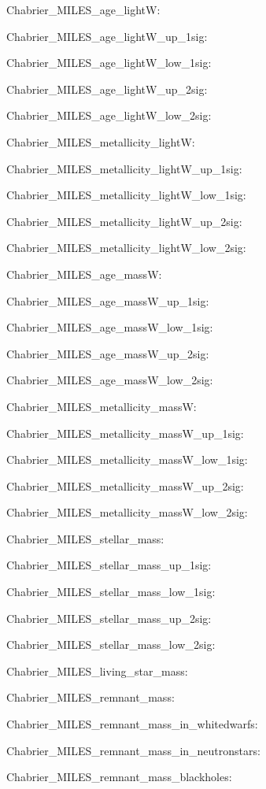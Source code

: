\item Chabrier\_MILES\_age\_lightW: 
\item Chabrier\_MILES\_age\_lightW\_up\_1sig: 
\item Chabrier\_MILES\_age\_lightW\_low\_1sig: 
\item Chabrier\_MILES\_age\_lightW\_up\_2sig: 
\item Chabrier\_MILES\_age\_lightW\_low\_2sig: 
\item Chabrier\_MILES\_metallicity\_lightW: 
\item Chabrier\_MILES\_metallicity\_lightW\_up\_1sig: 
\item Chabrier\_MILES\_metallicity\_lightW\_low\_1sig: 
\item Chabrier\_MILES\_metallicity\_lightW\_up\_2sig: 
\item Chabrier\_MILES\_metallicity\_lightW\_low\_2sig: 
\item Chabrier\_MILES\_age\_massW: 
\item Chabrier\_MILES\_age\_massW\_up\_1sig: 
\item Chabrier\_MILES\_age\_massW\_low\_1sig: 
\item Chabrier\_MILES\_age\_massW\_up\_2sig: 
\item Chabrier\_MILES\_age\_massW\_low\_2sig: 
\item Chabrier\_MILES\_metallicity\_massW: 
\item Chabrier\_MILES\_metallicity\_massW\_up\_1sig: 
\item Chabrier\_MILES\_metallicity\_massW\_low\_1sig: 
\item Chabrier\_MILES\_metallicity\_massW\_up\_2sig: 
\item Chabrier\_MILES\_metallicity\_massW\_low\_2sig: 
\item Chabrier\_MILES\_stellar\_mass: 
\item Chabrier\_MILES\_stellar\_mass\_up\_1sig: 
\item Chabrier\_MILES\_stellar\_mass\_low\_1sig: 
\item Chabrier\_MILES\_stellar\_mass\_up\_2sig: 
\item Chabrier\_MILES\_stellar\_mass\_low\_2sig: 
\item Chabrier\_MILES\_living\_star\_mass: 
\item Chabrier\_MILES\_remnant\_mass: 
\item Chabrier\_MILES\_remnant\_mass\_in\_whitedwarfs: 
\item Chabrier\_MILES\_remnant\_mass\_in\_neutronstars: 
\item Chabrier\_MILES\_remnant\_mass\_blackholes: 

